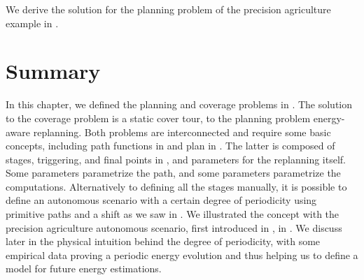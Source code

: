 We derive the solution for the planning problem of the precision agriculture example in .


\section{Summary}

In this chapter, we defined the planning and coverage problems in . The solution to the coverage problem is a static cover tour, to the planning problem energy-aware replanning. Both problems are interconnected and require some basic concepts, including path functions in  and plan in . The latter is composed of stages, triggering, and final points in , and parameters for the replanning itself. Some parameters parametrize the path, and some parameters parametrize the computations. 
Alternatively to defining all the stages manually, it is possible to define an autonomous scenario with a certain degree of periodicity using primitive paths and a shift as we saw in . We illustrated the concept with the precision agriculture autonomous scenario, first introduced in , in . We discuss later in  the physical intuition behind the degree of periodicity, with some empirical data proving a periodic energy evolution and thus helping us to define a model for future energy estimations.

